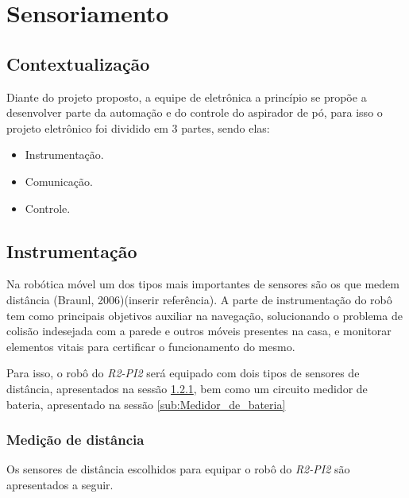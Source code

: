 \section{Sensoriamento} %
\label{sec:sensoriamento}
\subsection{Contextualização}

Diante do projeto proposto, a equipe de eletrônica a princípio se propõe a desenvolver parte da automação e do controle do aspirador de pó, para isso o projeto eletrônico foi dividido em 3 partes, sendo elas:
  \begin{itemize}
    \item Instrumentação.
    \item Comunicação.
    \item Controle.
  \end{itemize}

\subsection{Instrumentação} %
\label{sub:instrumentação}


	Na robótica móvel um dos tipos mais importantes de sensores são os que medem distância (Braunl, 2006)(inserir referência). A parte de instrumentação do robô tem como principais objetivos auxiliar na navegação, solucionando o problema de colisão indesejada com a parede e outros móveis presentes na casa, e monitorar elementos vitais para certificar o funcionamento do mesmo.

	Para isso, o robô do \textit{R2-PI2} será equipado com dois tipos de sensores de distância, apresentados na sessão \ref{sub:Medição_de_distância}, bem como um circuito medidor de bateria, apresentado na sessão \ref{sub:Medidor_de_bateria}

\subsubsection{Medição de distância}
\label{sub:Medição_de_distância}
	Os sensores de distância escolhidos para equipar o robô do \textit{R2-PI2} são apresentados a seguir.
  
